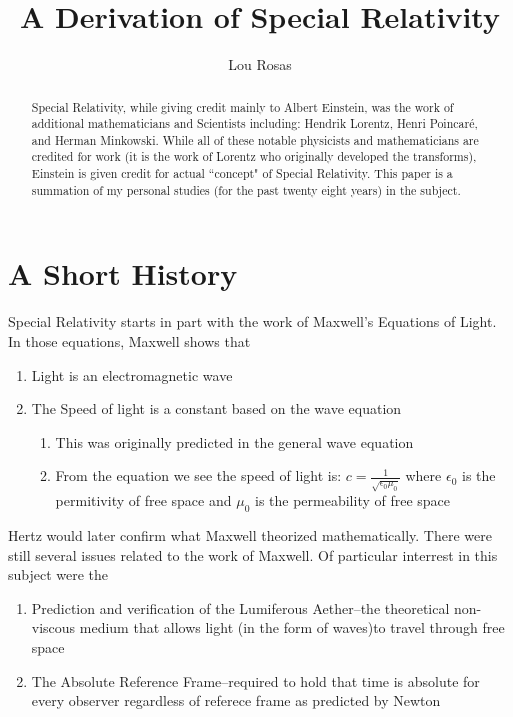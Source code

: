 \documentclass[journal]{IEEEtran}
\begin{document}
\title{A Derivation of Special Relativity}
\author{Lou Rosas}
\maketitle
\noindent
\begin{abstract}
Special Relativity, while giving credit mainly to Albert Einstein, 
was the work of additional mathematicians and Scientists including:  
Hendrik Lorentz, Henri Poincar\'e, and Herman Minkowski.  While all of
these notable physicists and mathematicians are credited for work (it
is the work of Lorentz who originally developed the transforms),
Einstein is given credit for actual ``concept" of Special Relativity.
This paper is a summation of my personal studies (for the past twenty
eight years) in the subject.
\end{abstract}
\section{A Short History}
Special Relativity starts in part with the work of Maxwell's Equations
of Light.  In those equations, Maxwell shows that
\begin{enumerate}
\item Light is an electromagnetic wave
\item The Speed of light is a constant based on the wave equation
\begin{enumerate}
\item This was originally predicted in the general wave equation
\item From the equation we see the speed of light is:
$c = \frac{1}{\sqrt{\epsilon_0\mu_0}}$ where $\epsilon_0$ is the
permitivity of free space and $\mu_0$ is the permeability of free space
\end{enumerate}
\end{enumerate}
Hertz would later confirm what Maxwell theorized mathematically.
There were still several issues related to the work of Maxwell.  Of
particular interrest in this subject were the
\begin{enumerate}
\item Prediction and verification of the Lumiferous Aether--the
theoretical non-viscous medium that allows light (in the form of
waves)to travel through
free space
\item The Absolute Reference Frame--required to hold that time is
absolute for every observer regardless of referece frame as predicted
by Newton
\end{enumerate}
\end{document}
